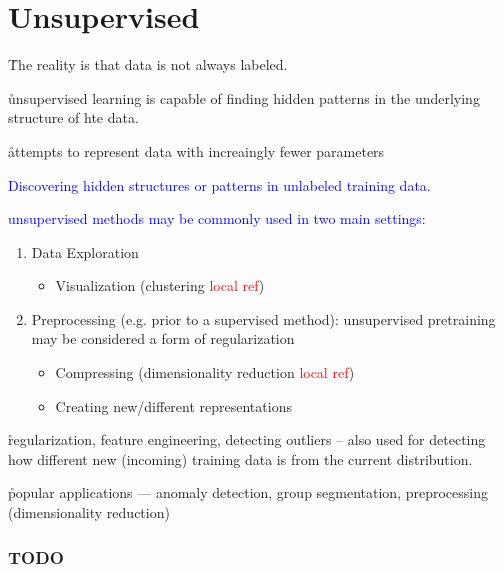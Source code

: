 


\chapter{Unsupervised}

\r{The reality is that data is not always labeled.}

\r{unsupervised learning is capable of finding hidden patterns in the underlying structure of hte data.}

\r{attempts to represent data with increaingly fewer parameters}

\textcolor{blue}{Discovering hidden structures or patterns in unlabeled training data.}


\textcolor{blue}{unsupervised methods may be commonly used in two main settings:}
\begin{enumerate}[noitemsep,topsep=0pt]
	\item Data Exploration
	\begin{itemize}[noitemsep,topsep=0pt]
		\item Visualization (clustering \textcolor{red}{local ref})
	\end{itemize}
	\item Preprocessing (e.g. prior to a supervised method): unsupervised pretraining may be considered a form of regularization
	\begin{itemize}[noitemsep,topsep=0pt]
		\item Compressing (dimensionality reduction \textcolor{red}{local ref})
		\item Creating new/different representations
	\end{itemize}
\end{enumerate}

\r{regularization, feature engineering, detecting outliers -- also used for detecting how different new (incoming) training data is from the current distribution.}

\r{popular applications --- anomaly detection, group segmentation, preprocessing (dimensionality reduction)}

\subsection{TODO}

